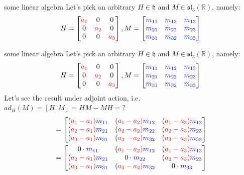 \documentclass{beamer}
\newcommand{\R}{\mathbb{R}}
\begin{document}
\begin{frame}{some linear algebra}
	Let's pick an arbitrary $H \in \mathfrak{h}$ and $M \in \mathfrak{sl}_3(\R)$, namely: \[
		H = \def\a{\color{red}a} \begin{bmatrix} \a_1 & 0 & 0 \\ 0 & \a_2 &0 \\ 0 &0 &\a_3 \end{bmatrix}, M = \def\m{\color{blue}m} \begin{bmatrix} \m_{11} & \m_{12} & \m_{13} \\ \m_{21} & \m_{22} & \m_{23} \\ \m_{31} & \m_{32} & \m_{33} \end{bmatrix} 
	\] 
\end{frame}




\begin{frame}{some linear algebra}
	Let's pick an arbitrary $H \in \mathfrak{h}$ and $M \in \mathfrak{sl}_3(\R)$, namely: \[
		H = \def\a{\color{red}a} \begin{bmatrix} \a_1 & 0 & 0 \\ 0 & \a_2 &0 \\ 0 &0 &\a_3 \end{bmatrix}, M = \def\m{\color{blue}m} \begin{bmatrix} \m_{11} & \m_{12} & \m_{13} \\ \m_{21} & \m_{22} & \m_{23} \\ \m_{31} & \m_{32} & \m_{33} \end{bmatrix} 
	\]
	Let's see the result under adjoint action, i.e. $ad_{H}(M) = [H,M] = HM-MH = ?$
	\begin{align*}
		[H,M] &= \def\a{\color{red}a} \def\m{\color{blue}m} \begin{bmatrix} (\a_1-\a_1)\m_{11} & (\a_1-\a_2)\m_{12} & (\a_1-\a_3)\m_{13} \\ (\a_2-\a_1)\m_{21} & (\a_2-\a_2)\m_{22} & (\a_2-\a_3)\m_{23} \\ (\a_3-\a_1)\m_{31} & (\a_3-\a_2)\m_{32} & (\a_3-\a_3)\m_{33} \end{bmatrix} \\
		      &=  \def\a{\color{red}a} \def\m{\color{blue}m} \begin{bmatrix} 0 \cdot \m_{11} & (\a_1-\a_2)\m_{12} & (\a_1-\a_3)\m_{13} \\ (\a_2-\a_1)\m_{21} & 0 \cdot \m_{22} & (\a_2-\a_3)\m_{23} \\ (\a_3-\a_1)\m_{31} & (\a_3-\a_2)\m_{32} & 0 \cdot \m_{33} \end{bmatrix} 
	\end{align*}
\end{frame}
\end{document}
